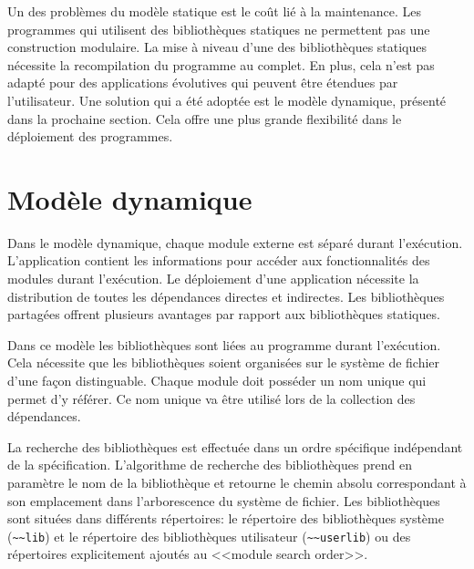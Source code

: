 

Un des problèmes du modèle statique est le coût lié à la maintenance.  Les
programmes qui utilisent des bibliothèques statiques ne permettent pas une
construction modulaire. La mise à niveau d'une des bibliothèques statiques
nécessite la recompilation du programme au complet. En plus, cela n'est pas
adapté pour des applications évolutives qui peuvent être étendues
par l'utilisateur. Une solution qui a été adoptée est le
modèle dynamique, présenté dans la prochaine section. Cela offre une plus grande
flexibilité dans le déploiement des programmes.


\section{Modèle dynamique}
\label{sec:ch4_model_dynamic}

Dans le modèle dynamique, chaque module externe est séparé durant l'exécution.
L'application contient les informations pour accéder aux fonctionnalités des
modules durant l'exécution. Le déploiement d'une application nécessite la
distribution de toutes les dépendances directes et indirectes.  Les
bibliothèques partagées offrent plusieurs avantages par rapport aux
bibliothèques statiques.

Dans ce modèle les bibliothèques sont liées au programme durant l'exécution. Cela
nécessite que les bibliothèques soient organisées sur le système de fichier d'une façon
distinguable. Chaque module doit posséder un nom unique qui permet d'y référer.
Ce nom unique va être utilisé lors de la collection des dépendances.




La recherche des bibliothèques est effectuée dans un ordre spécifique
indépendant de la spécification.  L'algorithme de recherche des bibliothèques
prend en paramètre le nom de la bibliothèque et retourne le chemin absolu
correspondant à son emplacement dans l'arborescence du système de fichier. Les
bibliothèques sont situées dans différents répertoires:
le répertoire des bibliothèques système (\lstinline{~~lib}) et le
répertoire des bibliothèques utilisateur (\lstinline{~~userlib}) ou des répertoires
explicitement ajoutés au <<module search order>>.

